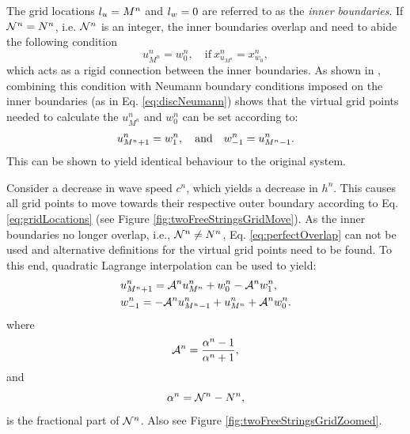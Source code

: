 \documentclass[fleqn]{jaes}
\begin{document}
The grid locations ${l_u} = M^n$ and ${l_w} = 0$ are referred to as the \textit{inner boundaries}. If $\mathcal{N}^n = N^n$, i.e. $\mathcal{N}^n$ is an integer, the inner boundaries overlap and need to abide the following condition
\begin{equation}\label{eq:rigid}
    u_{M^n}^n = w_0^n, \quad \text{if}\  x_{u_{M^n}}^n =  x_{w_0}^n,
\end{equation}
which acts as a rigid connection between the inner boundaries. As shown in
\cite{Willemsen2021a}, combining this condition with Neumann boundary conditions imposed on the inner boundaries (as in Eq. \eqref{eq:discNeumann}) shows that the virtual grid points needed to calculate the $u_{M^n}^n$ and $w_0^n$ can be set according to:
\begin{equation}\label{eq:perfectOverlap}
    u_{M^n+1}^n = w_1^n, \qaq w_{-1}^n = u_{M^n-1}^n.
\end{equation}
This can be shown to yield identical behaviour to the original system.

Consider a decrease in wave speed $c^n$, which yields a decrease in $h^n$. This causes all grid points to move towards their respective outer boundary according to Eq. \eqref{eq:gridLocations} (see Figure \ref{fig:twoFreeStringsGridMove}). As the inner boundaries no longer overlap, i.e., $\mathcal{N}^n \neq N^n$, Eq. \ref{eq:perfectOverlap} can not be used and alternative definitions for the virtual grid points need to be found. To this end, quadratic Lagrange interpolation can be used to yield:
\begin{subequations}\label{eq:connectionInterpol}
    \begin{align}
            &u_{M^n+1}^n = \Aterm u_{M^n}^n + w_0^n - \Aterm w_1^n,
        \label{eq:calcUMP1}\\
            &w_{-1}^n = -\Aterm u_{M^n-1}^n + u_{M^n}^n+\Aterm w_{0}^n.\label{eq:calcWM1}
    \end{align}
\end{subequations}
where
\begin{equation}
    \mathcal{A}^n = \frac{\alpha^n-1}{\alpha^n+1},
\end{equation}
and 
\begin{equation}\label{eq:alphaDef}
    \alpha^n = \Nfrac^n - N^n,
\end{equation}
is the fractional part of $\mathcal{N}^n$. Also see Figure \ref{fig:twoFreeStringsGridZoomed}.
\end{document}
